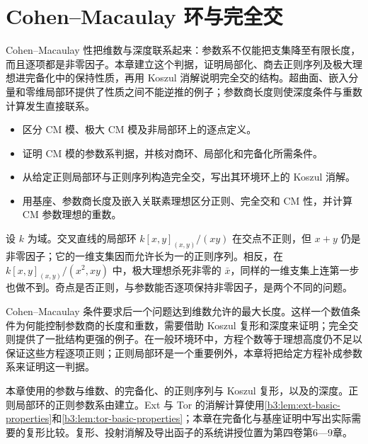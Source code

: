 
\chapter{Cohen–Macaulay 环与完全交}
\label{b3:ch:19}

\begin{chapterabstract}
	Cohen–Macaulay 性把维数与深度联系起来：参数系不仅能把支集降至有限长度，而且逐项都是非零因子。本章建立这个判据，证明局部化、商去正则序列及极大理想进完备化中的保持性质，再用 Koszul 消解说明完全交的结构。超曲面、嵌入分量和零维局部环提供了性质之间不能逆推的例子；参数商长度则使深度条件与重数计算发生直接联系。
\end{chapterabstract}

\begin{learninggoals}
	\begin{itemize}
		\item 区分 CM 模、极大 CM 模及非局部环上的逐点定义。
		\item 证明 CM 模的参数系判据，并核对商环、局部化和完备化所需条件。
		\item 从给定正则局部环与正则序列构造完全交，写出其环境环上的 Koszul 消解。
		\item 用基座、参数商长度及嵌入关联素理想区分正则、完全交和 CM 性，并计算 CM 参数理想的重数。
	\end{itemize}
\end{learninggoals}

设 \(k\) 为域。交叉直线的局部环 \(k[x,y]_{(x,y)}/(xy)\) 在交点不正则，但 \(x+y\) 仍是非零因子；它的一维支集因而允许长为一的正则序列。相反，在 \(k[x,y]_{(x,y)}/(x^2,xy)\) 中，极大理想杀死非零的 \(\bar x\)，同样的一维支集上连第一步也做不到。奇点是否正则，与参数能否逐项保持非零因子，是两个不同的问题。

\ProseParagraphBreak

Cohen–Macaulay 条件要求后一个问题达到维数允许的最大长度。这样一个数值条件为何能控制参数商的长度和重数，需要借助 Koszul 复形和深度来证明；完全交则提供了一批结构更强的例子。在一般环境环中，方程个数等于理想高度仍不足以保证这些方程逐项正则；正则局部环是一个重要例外，本章将把给定方程补成参数系来证明这一判据。

\ProseParagraphBreak

本章使用的参数与维数、的完备化、的正则序列与 Koszul 复形，以及的深度。正则局部环的正则参数系由建立。Ext 与 Tor 的消解计算使用\cref{b3:lem:ext-basic-properties}和\cref{b3:lem:tor-basic-properties}；本章在完备化与基座证明中写出实际需要的复形比较。复形、投射消解及导出函子的系统讲授位置为第四卷第6—9章。

